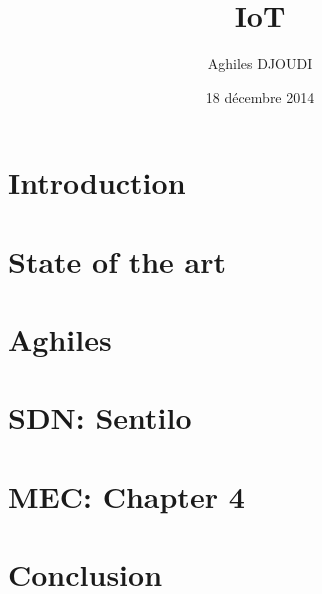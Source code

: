 \documentclass[a4paper, 12pt, twoside,openright]{report}
\title{IoT}
\author{Aghiles DJOUDI}
\date{18 décembre 2014}
\begin{document}
\preface
		
		
		
\body

% 
% 
% 
% 

\begin{landscape}

\end{landscape}


\chapter{Introduction}
\minitoc
	

\chapter{State of the art }
\minitoc
	
	
	
% 	
% 	

\chapter{Aghiles \cite{bregell_hardware_2015}}
\minitoc
	
	
	
	
	
	

\chapter{SDN: Sentilo \cite{_contiki_2016a}}
\minitoc
	
	
	
	
	
	

\chapter{MEC: Chapter 4}
\minitoc
	
	
	
	
	
	

\chapter{Conclusion}
\minitoc
	
\end{document}
